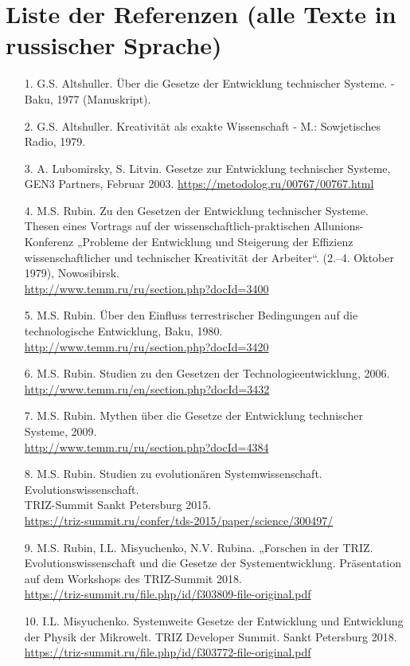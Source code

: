 \documentclass[11pt,a4paper]{article}
\begin{document}
\section*{Liste der Referenzen (alle Texte in russischer Sprache)}
\begin{itemize}
\item[1.] G.S. Altshuller. Über die Gesetze der Entwicklung technischer
  Systeme. - Baku, 1977 (Manuskript).
\item[2.] G.S. Altshuller. Kreativität als exakte Wissenschaft - M.:
  Sowjetisches Radio, 1979.
\item[3.] A. Lubomirsky, S. Litvin. Gesetze zur Entwicklung technischer
  Systeme, GEN3 Partners, Februar 2003.
  \url{https://metodolog.ru/00767/00767.html}
\item[4.] M.S. Rubin. Zu den Gesetzen der Entwicklung technischer Systeme.
  Thesen eines Vortrags auf der wissenschaftlich-praktischen
  Allunions-Konferenz „Probleme der Entwicklung und Steigerung der Effizienz
  wissenschaftlicher und technischer Kreativität der
  Arbeiter“. (2.--4. Oktober 1979), Nowosibirsk.\\
  \url{http://www.temm.ru/ru/section.php?docId=3400}
\item[5.] M.S. Rubin. Über den Einfluss terrestrischer Bedingungen auf die
  technologische Entwicklung, Baku, 1980.
  \url{http://www.temm.ru/ru/section.php?docId=3420}
\item[6.] M.S. Rubin. Studien zu den Gesetzen der Technologieentwicklung,
  2006.\\  \url{http://www.temm.ru/en/section.php?docId=3432}
\item[7.] M.S. Rubin. Mythen über die Gesetze der Entwicklung technischer
  Systeme, 2009.\\  \url{http://www.temm.ru/ru/section.php?docId=4384}
\item[8.] M.S. Rubin. Studien zu evolutionären Systemwissenschaft.
  Evolutionswissenschaft.\\ TRIZ-Summit Sankt Petersburg 2015.\\
  \url{https://triz-summit.ru/confer/tds-2015/paper/science/300497/}
\item[9.] M.S. Rubin, I.L. Misyuchenko, N.V. Rubina. „Forschen in der TRIZ.
  Evolutionswissenschaft und die Gesetze der Systementwicklung.  Präsentation
  auf dem Workshops des TRIZ-Summit 2018.\\
  \url{https://triz-summit.ru/file.php/id/f303809-file-original.pdf}
\item[10.] I.L. Misyuchenko. Systemweite Gesetze der Entwicklung und
  Entwicklung der Physik der Mikrowelt.  TRIZ Developer Summit.  Sankt
  Petersburg 2018.\\
  \url{https://triz-summit.ru/file.php/id/f303772-file-original.pdf}
\end{itemize}
\end{document}
